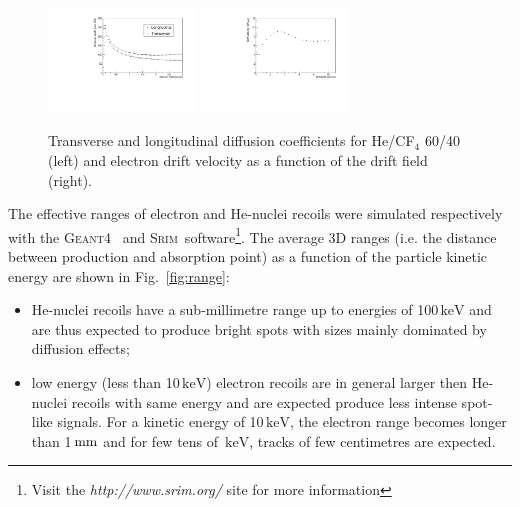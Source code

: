 \documentclass[physics,article,submit,moreauthors,pdftex]{Definitions/mdpi}
\newcommand{\GEANT} {{\textsc{Geant4}}\xspace}
\newcommand{\SRIM} {{\textsc{Srim}}\xspace}
\newcommand{\unit}[1]{\ensuremath{\textrm{\,#1}}\xspace}
\newcommand{\keV}{\ensuremath{\,\textrm{keV}}\xspace}
\begin{document}
\begin{figure}[t!]
\centering
\includegraphics[width=0.35\textwidth]{diff6040_zoom.pdf}
\includegraphics[width=0.35\textwidth]{vdrift6040.pdf}
\caption{Transverse and longitudinal diffusion coefficients for He/CF$_{4}$ 60/40 (left) and electron drift velocity as a function of the drift field (right).}
\label{fig:diff_vdrift}
\end{figure}


 
The effective ranges of electron and He-nuclei recoils were simulated
respectively with the \GEANT~\cite{bib:geant} and
 \SRIM~software\footnote{Visit the {\it http://www.srim.org/} site for more information}. The average 3D ranges (i.e. the distance between production and absorption point) as a function of the particle kinetic energy are shown in Fig.~\ref{fig:range}:
 \begin{itemize}
     \item He-nuclei recoils have a sub-millimetre range up to energies
       of 100\keV and are thus expected to produce bright spots with
       sizes mainly dominated by diffusion effects;
     \item low energy (less than 10\keV) electron recoils are in
       general larger then He-nuclei recoils with same energy and are
       expected produce less intense spot-like signals. For a kinetic
       energy of 10\keV, the electron range becomes longer than
       1\unit{mm} and for few tens of \keV, tracks of few centimetres
       are expected.
 \end{itemize}
\end{document}
